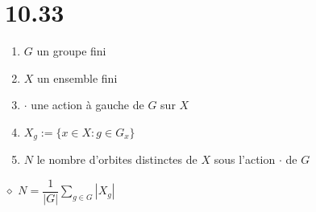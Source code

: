\documentclass[a4paper,10pt]{article}
\begin{document}
\section*{10.33}
\begin{enumerate}
 \item $G$ un groupe fini
 \item $X$ un ensemble fini
 \item $\cdot$ une action à gauche de $G$ sur $X$
 \item $X_g := \{x \in X : g \in G_x \}$
 \item $N$ le nombre d'orbites distinctes de $X$ sous l'action $\cdot$ de $G$
\end{enumerate}
$\diamond$ \textbf{$N=\dfrac{1}{|G|}\sum_{g\in G}|X_g|$}
\end{document}
